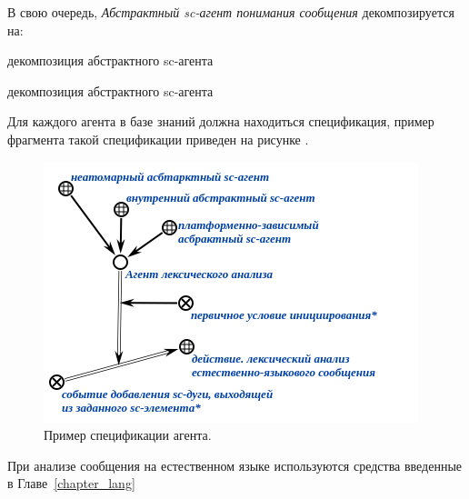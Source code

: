 {В свою очередь, \textit{Абстрактный sc-агент понимания сообщения} декомпозируется на:

\begin{SCn}

    \begin{scnrelfromset}{декомпозиция абстрактного sc-агента}
        \begin{scnindent}
            \begin{scnrelfromset}{декомпозиция абстрактного sc-агента}
            \end{scnrelfromset}
        \end{scnindent}
    \end{scnrelfromset}

\end{SCn}

Для каждого агента в базе знаний должна находиться спецификация, пример фрагмента такой спецификации приведен на рисунке \textit{}.

\begin{figure}[h]
    \centering
    \includegraphics[scale=0.8]{images/part4/chapter_nl_interfaces/agent_spec}
    \caption{Пример спецификации агента.}
    \label{fig:agent_spec}
\end{figure}

При анализе сообщения на естественном языке используются средства введенные в Главе~\ref{chapter_lang}

}
